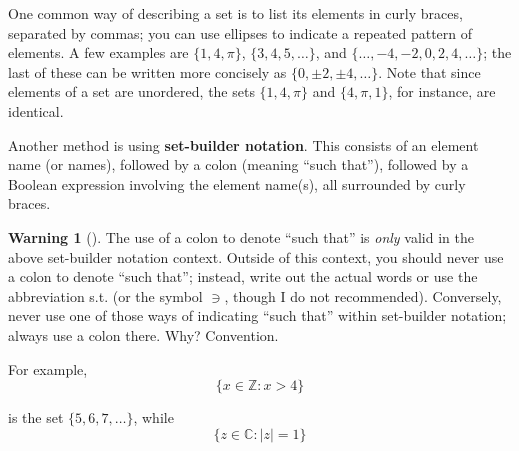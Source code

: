 \documentclass[10pt,]{book}
\newcommand{\terminology}[1]{\textbf{#1}}
\theoremstyle{plain}
\theoremstyle{definition}
\theoremstyle{definition}
\newtheorem{warning}[theorem]{Warning}
\theoremstyle{definition}
\theoremstyle{definition}
\numberwithin{equation}{section}
\def\Z{\mathbb{Z}}
\def\C{\mathbb{C}}
\begin{document}
    One common way of describing a set is to list its elements in
    curly braces, separated by commas; you can use ellipses to
    indicate a repeated pattern of elements. A few examples are
    \(\{1,4,\pi\}\), \(\{3, 4, 5, \ldots\}\), and \(\{\ldots, -4, -2, 0,
    2, 4, \ldots\}\); the last of these can be written more concisely as \(\{0,\pm 2, \pm 4,\ldots\}\). Note that since elements of a set are
    unordered, the sets \(\{1,4,\pi\}\) and \(\{4,\pi, 1\}\), for
    instance, are identical.
\par

    Another method is using \terminology{set-builder notation}. This consists of an element name (or
    names), followed by a colon (meaning ``such that''), followed by
    a Boolean expression involving the element name(s), all
    surrounded by curly braces.%
\begin{warning}[]\label{warning-1}
The use of a colon to denote ``such that'' is \emph{only} valid in the above set-builder notation context.  Outside of this context, you should never use a colon to denote ``such that''; instead, write out the actual words or use the abbreviation s.t. (or the symbol \(\ni\), though I do not recommended).  Conversely, never use one of those ways of indicating ``such that'' within set-builder notation; always use a colon there.  Why?  Convention.%
\end{warning}
\par

    For example,
\begin{equation*}

      \{x\in \Z : x > 4\}
    
\end{equation*}

    is the set \(\{5, 6, 7, \ldots\}\), while
\begin{equation*}

      \{z\in \C : |z|=1\}
    
\end{equation*}
\end{document}
